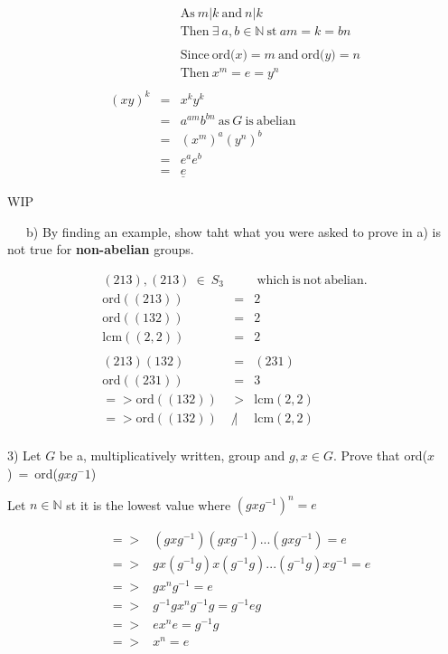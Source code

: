 \documentclass[11pt]{article}
\begin{document}
\begin{eqnarray*}
&&\mathrm{As}\ m|k\ \mathrm{and}\ n|k\\
&&\mathrm{Then}\ \exists\ a,b \in \mathbb{N}\ \mathrm{st}\ am=k=bn\\
\\&&\mathrm{Since\ ord(}x\mathrm{)}=m\mathrm{\ and\ ord(}y\mathrm{)}=n\\
&&\mathrm{Then}\ x^m=e=y^n\\
\\(xy)^k&=&x^ky^k\\
&=&a^{am}b^{bn}\ \mathrm{as\ \textit{G}\ is\ abelian}\\
&=&(x^m)^a(y^n)^b\\
&=&e^ae^b\\
&=&\underline{e}
\end{eqnarray*}

{\huge WIP}

\begin{flushleft}\ \ \  b) By finding an example, show taht what you were asked to prove in a) is not true for \textbf{non-abelian} groups.
\end{flushleft}
\begin{eqnarray*}
(2 1 3), (2 1 3)\ \in\ S_3&&\ \mathrm{which\ is\ not\ abelian.}\\
\mathrm{ord}((2 1 3))&=&2\\
\mathrm{ord}((1 3 2))&=&2\\
\mathrm{lcm}((2,2))&=&2\\
\\(2 1 3)(1 3 2)&=&(2 3 1)\\
\mathrm{ord}((2 3 1))&=&3\\
=>\mathrm{ord}((1 3 2))&>&\mathrm{lcm}(2,2)\\
=>\mathrm{ord}((1 3 2))&\not|&\mathrm{lcm}(2,2)\\
\end{eqnarray*}

\begin{flushleft} 3) Let $G$ be a, multiplicatively written, group and $g,x \in G$. Prove that ord($x$)\ =\ ord($gxg^-1$)
\end{flushleft}

\begin{center}
Let $n \in \mathbb{N}$ st it is the lowest value where $(gxg^{-1})^n=e$
\end{center}
\begin{eqnarray*}
&=>&(gxg^{-1})(gxg^{-1})...(gxg^{-1})=e\\
&=>&gx(g^{-1}g)x(g^{-1}g)...(g^{-1}g)xg^{-1}=e\\
&=>&gx^ng^{-1}=e\\
&=>&g^{-1}gx^ng^{-1}g=g^{-1}eg\\
&=>&ex^ne=g^{-1}g\\
&=>&x^n=e
\end{eqnarray*}
\end{document}
